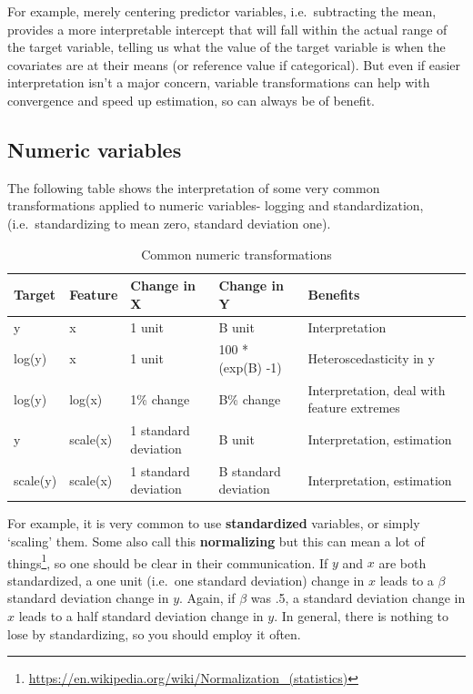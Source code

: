 \documentclass[
  letterpaper,
]{krantz}
\DeclareRobustCommand{\href}[2]{#2\footnote{\url{#1}}}
\begin{document}
For example, merely centering predictor variables, i.e.~subtracting the
mean, provides a more interpretable intercept that will fall within the
actual range of the target variable, telling us what the value of the
target variable is when the covariates are at their means (or reference
value if categorical). But even if easier interpretation isn't a major
concern, variable transformations can help with convergence and speed up
estimation, so can always be of benefit.

\subsection{Numeric variables}\label{numeric-variables}

The following table shows the interpretation of some very common
transformations applied to numeric variables- logging and
standardization, (i.e.~standardizing to mean zero, standard deviation
one).

\hypertarget{tbl-transformation}{}
\begin{longtable}{lllll}
\caption{\label{tbl-transformation}Common numeric transformations }\tabularnewline

\toprule
Target & Feature & Change in X & Change in Y & Benefits \\ 
\midrule\addlinespace[2.5pt]
y & x & 1 unit & B unit & Interpretation \\ 
log(y) & x & 1 unit & 100 * (exp(B) -1)  & Heteroscedasticity in y \\ 
log(y) & log(x) & 1\% change & B\% change & Interpretation, deal with feature extremes \\ 
y & scale(x) & 1 standard deviation & B unit & Interpretation, estimation \\ 
scale(y) & scale(x) & 1 standard deviation & B standard deviation & Interpretation, estimation \\ 
\bottomrule
\end{longtable}

For example, it is very common to use \textbf{standardized} variables,
or simply `scaling' them. Some also call this \textbf{normalizing} but
\href{https://en.wikipedia.org/wiki/Normalization_(statistics)}{this can
mean a lot of things}, so one should be clear in their communication. If
\(y\) and \(x\) are both standardized, a one unit (i.e.~one standard
deviation) change in \(x\) leads to a \(\beta\) standard deviation
change in \(y\). Again, if \(\beta\) was .5, a standard deviation change
in \(x\) leads to a half standard deviation change in \(y\). In general,
there is nothing to lose by standardizing, so you should employ it
often.
\end{document}
